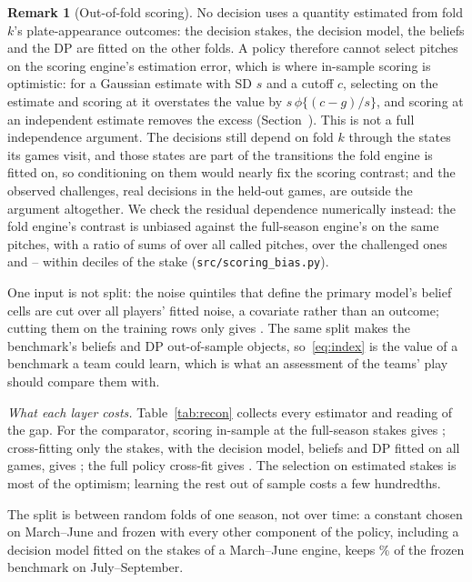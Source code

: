 \documentclass[aoas]{imsart}
\theoremstyle{plain}
\theoremstyle{definition}
\newtheorem{remark}{Remark}
\begin{document}
\begin{remark}[Out-of-fold scoring]\label{lem:honest}
No decision uses a quantity estimated from fold $k$'s plate-appearance outcomes: the decision stakes, the decision
model, the beliefs and the DP are fitted on the other folds. A policy therefore cannot select pitches on the scoring
engine's estimation error, which is where in-sample scoring is optimistic: for a Gaussian estimate with SD $s$ and a
cutoff $c$, selecting on the estimate and scoring at it overstates the value by $s\,\phi\{(c-g)/s\}$, and scoring at an
independent estimate removes the excess (Section~). This is not a full independence argument. The
decisions still depend on fold $k$ through the states its games visit, and those states are part of the transitions
the fold engine is fitted on, so conditioning on them would nearly fix the scoring contrast; and the observed
challenges, real decisions in the held-out games, are outside the argument altogether. We check the residual
dependence numerically instead: the fold engine's contrast is unbiased against the full-season engine's on the same
pitches, with a ratio of sums of \ScoreRatioAll{} over all called pitches, \ScoreRatioCh{} over the challenged ones and
\ScoreDecLo--\ScoreDecHi{} within deciles of the stake (\nolinkurl{src/scoring_bias.py}).
\end{remark}
\noindent One input is not split: the noise quintiles that define the primary model's belief cells are cut over all
players' fitted noise, a covariate rather than an outcome; cutting them on the training rows only gives
\GapTrainQFive. The same split makes the benchmark's beliefs and DP out-of-sample objects, so~\eqref{eq:index} is the
value of a benchmark a team could learn, which is what an assessment of the teams' play should compare them with.

\emph{What each layer costs.} Table~\ref{tab:recon} collects every estimator and reading of the gap. For the
comparator, scoring in-sample at the full-season stakes gives \WinsLostFull; cross-fitting only the stakes, with the
decision model, beliefs and DP fitted on all games, gives \WinsLost; the full policy cross-fit gives \GapMain. The
selection on estimated stakes is most of the optimism; learning the rest out of sample costs a few hundredths.

\begin{table}[t]
\caption{The gap, wins per team-season, by estimator and reading, primary intervention unless stated. In sample:
$R=40$ worlds; stakes cross-fitted only: $S=8$ (comparator) and $S=4$ (primary) splits; full policy cross-fit: $S=8$,
$R=16$ (Monte Carlo SE about 0.013 within a split). The last row is from the coverage study (Section~\ref{sec:eval}).
Every later number in the paper is one of these cells or is labelled otherwise.}\label{tab:recon}
\centering\small

\end{table} The split is between random folds of one season, not over time: a constant chosen on
March--June and frozen with every other component of the policy, including a decision model fitted on the stakes of a
March--June engine, keeps \FrozenRuleShareDP\% of the frozen benchmark on July--September.
\end{document}
